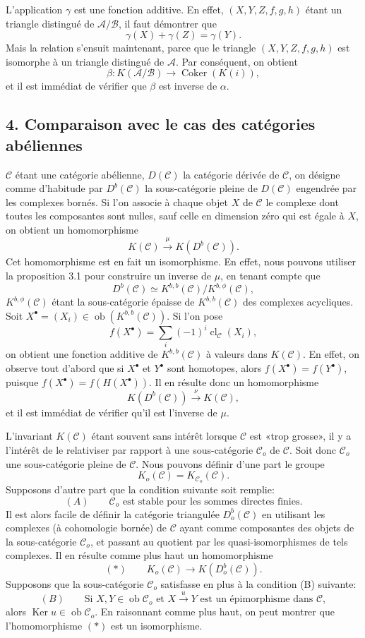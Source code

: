 \documentclass[11pt]{article}
\providecommand{\Ob}{\operatorname{ob}}
\providecommand{\cC}{\mathcal C}
\providecommand{\Ob}{\operatorname{ob}}
\providecommand{\cC}{\mathcal C}
\providecommand{\cA}{\mathcal A}
\providecommand{\cB}{\mathcal B}
\providecommand{\Ob}{\operatorname{Ob}}
\providecommand{\Ob}{\operatorname{ob}}
\providecommand{\Ob}{\operatorname{Ob}}
\begin{document}
L'application $\gamma$ est une fonction additive. En effet, $(X,Y,Z,f,g,h)$ étant un triangle distingué de $\cA/\cB$, il faut démontrer que
\[
\gamma(X)+\gamma(Z)=\gamma(Y).
\]
Mais la relation s'ensuit maintenant, parce que le triangle $(X,Y,Z,f,g,h)$ est isomorphe à un triangle distingué de $\cA$. Par conséquent, on obtient
\[
\beta:K(\cA/\cB)\longrightarrow \operatorname{Coker}(K(i)),
\]
et il est immédiat de vérifier que $\beta$ est inverse de $\alpha$.

\subsection*{4. Comparaison avec le cas des catégories abéliennes}

$\cC$ étant une catégorie abélienne, $D(\cC)$ la catégorie dérivée de $\cC$, on désigne comme d'habitude par $D^b(\cC)$ la sous-catégorie pleine de $D(\cC)$ engendrée par les complexes bornés. Si l'on associe à chaque objet $X$ de $\cC$ le complexe dont toutes les composantes sont nulles, sauf celle en dimension zéro qui est égale à $X$, on obtient un homomorphisme
\[
K(\cC)\xrightarrow{\mu}K(D^b(\cC)).
\]
Cet homomorphisme est en fait un isomorphisme. En effet, nous pouvons utiliser la proposition 3.1 pour construire un inverse de $\mu$, en tenant compte que
\[
D^b(\cC)\simeq K^{b,b}(\cC)/K^{b,\phi}(\cC),
\]
$K^{b,\phi}(\cC)$ étant la sous-catégorie épaisse de $K^{b,b}(\cC)$ des complexes acycliques. Soit $X^\bullet=(X_i)\in\Ob(K^{b,b}(\cC))$. Si l'on pose
\[
f(X^\bullet)=\sum_i(-1)^i\operatorname{cl}_{\cC}(X_i),
\]
on obtient une fonction additive de $K^{b,b}(\cC)$ à valeurs dans $K(\cC)$. En effet, on observe tout d'abord que si $X^\bullet$ et $Y^\bullet$ sont homotopes, alors $f(X^\bullet)=f(Y^\bullet)$, puisque $f(X^\bullet)=f(H(X^\bullet))$. Il en résulte donc un homomorphisme
\[
K(D^b(\cC))\xrightarrow{\nu}K(\cC),
\]
et il est immédiat de vérifier qu'il est l'inverse de $\mu$.

L'invariant $K(\cC)$ étant souvent sans intérêt lorsque $\cC$ est «trop grosse», il y a l'intérêt de le relativiser par rapport à une sous-catégorie $\cC_o$ de $\cC$. Soit donc $\cC_o$ une sous-catégorie pleine de $\cC$. Nous pouvons définir d'une part le groupe
\[
K_o(\cC)=K_{\cC_o}(\cC).
\]
Supposons d'autre part que la condition suivante soit remplie:
\[
(A)\qquad \cC_o\text{ est stable pour les sommes directes finies.}
\]
Il est alors facile de définir la catégorie triangulée $D_o^b(\cC)$ en utilisant les complexes (à cohomologie bornée) de $\cC$ ayant comme composantes des objets de la sous-catégorie $\cC_o$, et passant au quotient par les quasi-isomorphismes de tels complexes. Il en résulte comme plus haut un homomorphisme
\[
(*)\qquad K_o(\cC)\longrightarrow K(D_o^b(\cC)).
\]
Supposons que la sous-catégorie $\cC_o$ satisfasse en plus à la condition (B) suivante:
\[
(B)\qquad
\text{Si }X,Y\in\Ob\cC_o\text{ et }X\xrightarrow{u}Y
\text{ est un épimorphisme dans }\cC,
\]
alors $\operatorname{Ker}u\in\Ob\cC_o$. En raisonnant comme plus haut, on peut montrer que l'homomorphisme $(*)$ est un isomorphisme.
\end{document}
